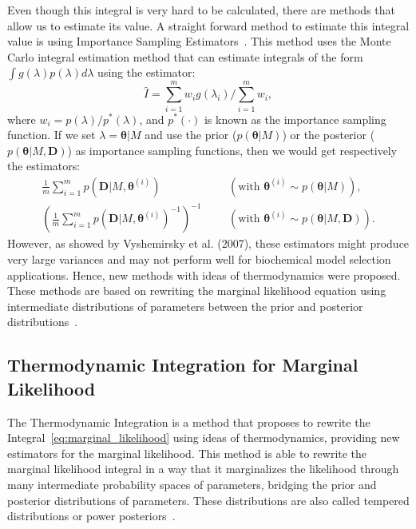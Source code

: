 Even though this integral is very hard to be calculated, there are 
methods that allow us to estimate its value. A straight forward method 
to estimate this integral value is using Importance Sampling 
Estimators~\cite{Newton1993}. This method uses the Monte Carlo integral 
estimation method that can estimate integrals of the form 
$\int g(\lambda) p(\lambda)d\lambda$ using the estimator:
\begin{equation*}
    \hat{I} = \sum_{i = 1}^m w_i g(\lambda_i) / \sum_{i = 1}^m w_i,
\label{eq:importance_sampling_estimator}
\end{equation*}
where $w_i = p (\lambda) / p^* (\lambda)$, and $p^*(\cdot)$ is known as 
the importance sampling function. If we set $\lambda = {\bm\theta} | M$ 
and use the prior ($p({\bm \theta} | M)$) or the posterior ($p({\bm
\theta} | M, {\bm D})$) as importance sampling functions, then we would
get respectively the estimators:
\begin{equation*}
\begin{aligned}
    \frac{1}{m} \sum_{i = 1}^m p({\bm D}|M, {\bm \theta}^{(i)}) &&& 
        (\text{with } {\bm \theta}^{(i)} \sim p({\bm \theta}|M)), \\
    \left(\frac{1}{m} \sum_{i = 1}^m p({\bm D}|M, 
            {\bm \theta}^{(i)})^{-1} \right)^{-1} &&&
        (\text{with } {\bm \theta}^{(i)} \sim p({\bm \theta}|M, 
            {\bm D})).
\end{aligned}
\end{equation*}
However, as showed by Vyshemirsky et al. (2007), these estimators might
produce very large variances and may not perform well for biochemical
model selection applications. Hence, new methods with ideas of 
thermodynamics were proposed. These methods are based on rewriting the
marginal likelihood equation using intermediate distributions of 
parameters between the prior and posterior 
distributions~\cite{Friel2008}.

\subsection{Thermodynamic Integration for Marginal Likelihood}
The Thermodynamic Integration is a method that proposes to rewrite
the Integral~\ref{eq:marginal_likelihood} using ideas of thermodynamics,
providing new estimators for the marginal likelihood. This method is
able to rewrite the marginal likelihood integral in a way that it 
marginalizes the likelihood through many intermediate probability spaces 
of parameters, bridging the prior and posterior distributions of 
parameters. These distributions are also called tempered distributions
or power posteriors~\cite{Friel2008}.

